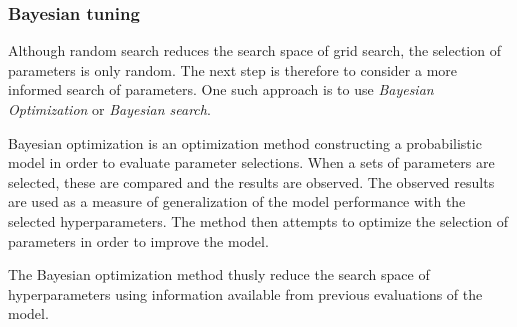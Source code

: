 \subsubsection{Bayesian tuning}

Although random search reduces the search space of grid search, the selection of parameters is only random.
The next step is therefore to consider a more informed search of parameters.
One such approach is to use \textit{Bayesian Optimization} or \textit{Bayesian search}.

Bayesian optimization is an optimization method constructing a probabilistic model in order to evaluate parameter selections.
When a sets of parameters are selected, these are compared and the results are observed.
The observed results are used as a measure of generalization of the model performance with the selected hyperparameters.
The method then attempts to optimize the selection of parameters in order to improve the model.

The Bayesian optimization method thusly reduce the search space of hyperparameters using information available from previous evaluations of the model. 


